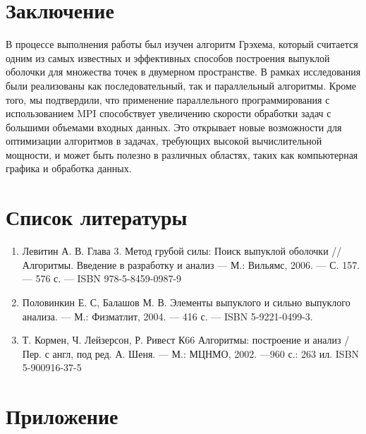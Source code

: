 \documentclass[a4paper,12pt]{article}
\begin{document}
\newpage

\section*{Заключение}
\hspace*{15pt}В процессе выполнения работы был изучен алгоритм Грэхема, который считается одним из самых известных и эффективных способов построения выпуклой оболочки для множества точек в двумерном пространстве. В рамках исследования были реализованы как последовательный, так и параллельный алгоритмы. Кроме того, мы подтвердили, что применение параллельного программирования с использованием MPI способствует увеличению скорости обработки задач с большими объемами входных данных. Это открывает новые возможности для оптимизации алгоритмов в задачах, требующих высокой вычислительной мощности, и может быть полезно в различных областях, таких как компьютерная графика и обработка данных.

\newpage

\section*{Список литературы}

\begin{enumerate}
	\item Левитин А. В. Глава 3. Метод грубой силы: Поиск выпуклой оболочки // Алгоритмы. Введение в разработку и анализ — М.: Вильямс, 2006. — С. 157. — 576 с. — ISBN 978-5-8459-0987-9
	\item Половинкин Е. С, Балашов М. В. Элементы выпуклого и сильно выпуклого анализа. — М.: Физматлит, 2004. — 416 с. — ISBN 5-9221-0499-3.
	\item Т. Кормен, Ч. Лейзерсон, Р. Ривест
	К66 Алгоритмы: построение и анализ / Пер. с англ, под ред.
	А. Шеня. — М.: МЦНМО, 2002. —960 с.: 263 ил.
	ISBN 5-900916-37-5

\end{enumerate}

\newpage

\section*{Приложение}
\end{document}
